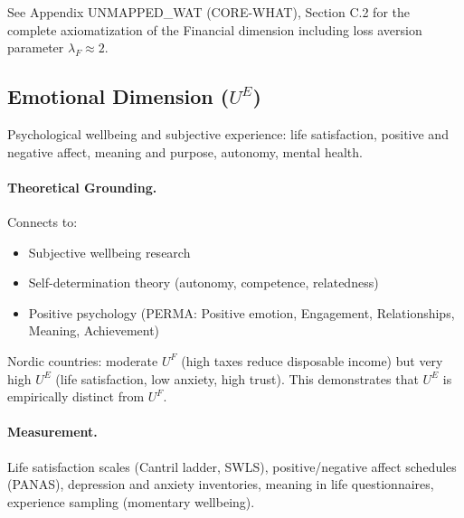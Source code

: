 \begin{cross-reference}
See Appendix UNMAPPED_WAT (CORE-WHAT), Section C.2 for the complete axiomatization of
the Financial dimension including loss aversion parameter $\lambda_F \approx 2$.
\end{cross-reference}

\subsection{Emotional Dimension ($U^E$)}
\label{sec:fepsde-emotional}

\begin{definition}
Psychological wellbeing and subjective experience: life satisfaction,
positive and negative affect, meaning and purpose, autonomy, mental health.
\end{definition}

\paragraph{Theoretical Grounding.}
Connects to:
\begin{itemize}[nosep]
  \item Subjective wellbeing research \citep{diener1999}
  \item Self-determination theory (autonomy, competence, relatedness)
  \item Positive psychology (PERMA: Positive emotion, Engagement, Relationships, Meaning, Achievement)
\end{itemize}

\begin{intuition}
Nordic countries: moderate $U^F$ (high taxes reduce disposable income)
but very high $U^E$ (life satisfaction, low anxiety, high trust).
This demonstrates that $U^E$ is empirically distinct from $U^F$.
\end{intuition}

\paragraph{Measurement.}
Life satisfaction scales (Cantril ladder, SWLS), positive/negative affect schedules (PANAS),
depression and anxiety inventories, meaning in life questionnaires,
experience sampling (momentary wellbeing).


